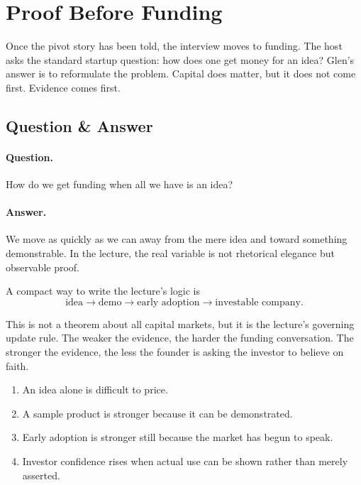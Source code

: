 \section{Proof Before Funding}

Once the pivot story has been told, the interview moves to funding. The host asks the standard startup question: how does one get money for an idea? Glen's answer is to reformulate the problem. Capital does matter, but it does not come first. Evidence comes first.

\subsection{Question \& Answer}

\paragraph{Question.} How do we get funding when all we have is an idea?

\paragraph{Answer.} We move as quickly as we can away from the mere idea and toward something demonstrable. In the lecture, the real variable is not rhetorical elegance but observable proof.

A compact way to write the lecture's logic is
\begin{equation}
\text{idea}\to \text{demo}\to \text{early adoption}\to \text{investable company}.
\end{equation}

This is not a theorem about all capital markets, but it is the lecture's governing update rule. The weaker the evidence, the harder the funding conversation. The stronger the evidence, the less the founder is asking the investor to believe on faith.

\begin{enumerate}
\item An idea alone is difficult to price.
\item A sample product is stronger because it can be demonstrated.
\item Early adoption is stronger still because the market has begun to speak.
\item Investor confidence rises when actual use can be shown rather than merely asserted.
\end{enumerate}

